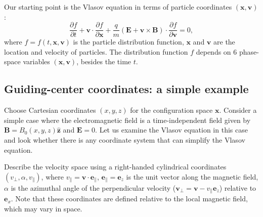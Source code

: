 \documentclass{article}
\begin{document}
Our starting point is the Vlasov equation in terms of particle coordinates
$(\mathbf{x}, \mathbf{v})$:
\begin{equation}
  \label{22-11-12-1} \frac{\partial f}{\partial t} +\mathbf{v} \cdot
  \frac{\partial f}{\partial \mathbf{x}} + \frac{q}{m} (\mathbf{E}+\mathbf{v}
  \times \mathbf{B}) \cdot \frac{\partial f}{\partial \mathbf{v}} = 0,
\end{equation}
where $f = f (t, \mathbf{x}, \mathbf{v})$ is the particle distribution
function, $\mathbf{x}$ and $\mathbf{v}$ are the location and velocity of
particles. The distribution function $f$ depends on 6 phase-space variables
$(\mathbf{x}, \mathbf{v})$, besides the time $t$.

\subsection{Guiding-center coordinates: a simple example}\label{19-4-23-p1}

Choose Cartesian coordinates $(x, y, z)$ for the configuration space
$\mathbf{x}$. Consider a simple case where the electromagnetic field is a
time-independent field given by $\mathbf{B}= B_0 (x, y, z) \hat{\mathbf{z}}$
and $\mathbf{E}= 0$. Let us examine the Vlasov equation in this case and look
whether there is any coordinate system that can simplify the Vlasov equation.

Describe the velocity space using a right-handed cylindrical coordinates
$(v_{\perp}, \alpha, v_{\parallel})$, where $v_{\parallel} =\mathbf{v} \cdot
\mathbf{e}_{\parallel}$, $\mathbf{e}_{\parallel} =\mathbf{e}_z$ is the unit
vector along the magnetic field, $\alpha$ is the azimuthal angle of the
perpendicular velocity ($\mathbf{v}_{\perp} =\mathbf{v}- v_{\parallel}
\mathbf{e}_z$) relative to $\mathbf{e}_x$. Note that these coordinates are
defined relative to the local magnetic field, which may vary in space.
\end{document}
